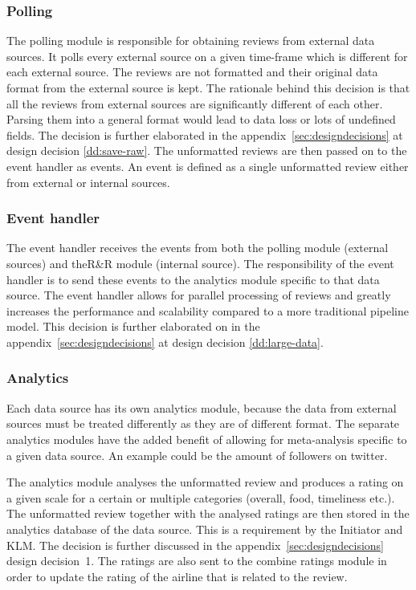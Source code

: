 \subsubsection{Polling}
The polling module is responsible for obtaining reviews from external data sources. It polls every external source on a given time-frame which is different for each external source. The reviews are not formatted and their original data format from the external source is kept. The rationale behind this decision is that all the reviews from external sources are significantly different of each other. Parsing them into a general format would lead to data loss or lots of undefined fields. The decision is further elaborated in the appendix~\ref{sec:designdecisions} at design decision \ref{dd:save-raw}. The unformatted reviews are then passed on to the event handler as events. An event is defined as a single unformatted review either from external or internal sources.

\subsubsection{Event handler}
The event handler receives the events from both the polling module (external sources) and theR\&R module (internal source). The responsibility of the event handler is to send these events to the analytics module specific to that data source. The event handler allows for parallel processing of reviews and greatly increases the performance and scalability compared to a more traditional pipeline model. This decision is further elaborated on in the appendix~\ref{sec:designdecisions} at design decision \ref{dd:large-data}.

\subsubsection{Analytics}
Each data source has its own analytics module, because the data  from external sources must be treated differently as they are of different format. The separate analytics modules have the added benefit of allowing for meta-analysis specific to a given data source. An example could be the amount of followers on twitter.

The analytics module analyses the unformatted review and produces a rating on a given scale for a certain or multiple categories (overall, food, timeliness etc.). The unformatted review together with the analysed ratings are then stored in the analytics database of the data source. This is a requirement by the Initiator and KLM. The decision is further discussed in the appendix~\ref{sec:designdecisions} design decision~1. The ratings are also sent to the combine ratings module in order to update the rating of the airline that is related to the review.

